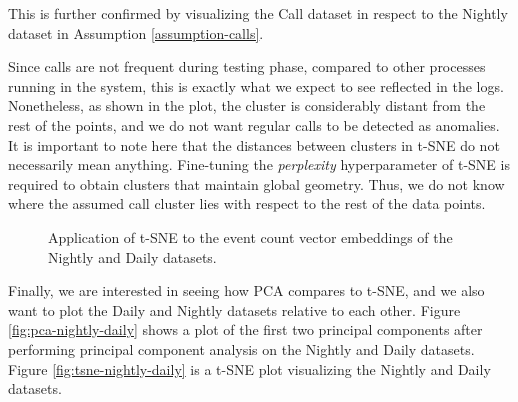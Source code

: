 This is further confirmed by visualizing the Call dataset in respect to the Nightly dataset in Assumption \ref{assumption-calls}.

Since calls are not frequent during testing phase, compared to other processes running in the system, this is exactly what we expect to see reflected in the logs. Nonetheless, as shown in the plot, the cluster is considerably distant from the rest of the points, and we do not want regular calls to be detected as anomalies. It is important to note here that the distances between clusters in t-SNE do not necessarily mean anything. Fine-tuning the \textit{perplexity} hyperparameter of t-SNE is required to obtain clusters that maintain global geometry. Thus, we do not know where the assumed call cluster lies with respect to the rest of the data points.

\begin{figure}%
    \centering
    \qquad
    \caption{Application of t-SNE to the event count vector embeddings of the Nightly and Daily datasets.}%
    \label{fig:tsne-single}%
\end{figure}

Finally, we are interested in seeing how PCA compares to t-SNE, and we also want to plot the Daily and Nightly datasets relative to each other. Figure \ref{fig:pca-nightly-daily} shows a plot of the first two principal components after performing principal component analysis on the Nightly and Daily datasets. Figure \ref{fig:tsne-nightly-daily} is a t-SNE plot visualizing the Nightly and Daily datasets.

